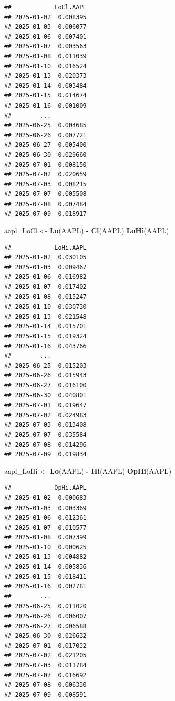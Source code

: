 \documentclass[]{ctexbook}
\newenvironment{Shaded}{\begin{snugshade}}{\end{snugshade}}
\newcommand{\FunctionTok}[1]{\textcolor[rgb]{0.13,0.29,0.53}{\textbf{#1}}}
\newcommand{\NormalTok}[1]{#1}
\newcommand{\OtherTok}[1]{\textcolor[rgb]{0.56,0.35,0.01}{#1}}
\newcommand{\SpecialCharTok}[1]{\textcolor[rgb]{0.81,0.36,0.00}{\textbf{#1}}}
\begin{document}
\begin{verbatim}
##            LoCl.AAPL
## 2025-01-02  0.008395
## 2025-01-03  0.006077
## 2025-01-06  0.007401
## 2025-01-07  0.003563
## 2025-01-08  0.011039
## 2025-01-10  0.016524
## 2025-01-13  0.020373
## 2025-01-14  0.003484
## 2025-01-15  0.014674
## 2025-01-16  0.001009
##        ...          
## 2025-06-25  0.004685
## 2025-06-26  0.007721
## 2025-06-27  0.005400
## 2025-06-30  0.029660
## 2025-07-01  0.008150
## 2025-07-02  0.020659
## 2025-07-03  0.008215
## 2025-07-07  0.005508
## 2025-07-08  0.007484
## 2025-07-09  0.018917
\end{verbatim}

\begin{Shaded}
\begin{Highlighting}[]
\NormalTok{aapl\_LoCl }\OtherTok{\textless{}{-}} \FunctionTok{Lo}\NormalTok{(AAPL) }\SpecialCharTok{{-}} \FunctionTok{Cl}\NormalTok{(AAPL)}
\FunctionTok{LoHi}\NormalTok{(AAPL)}
\end{Highlighting}
\end{Shaded}

\begin{verbatim}
##            LoHi.AAPL
## 2025-01-02  0.030105
## 2025-01-03  0.009467
## 2025-01-06  0.016982
## 2025-01-07  0.017402
## 2025-01-08  0.015247
## 2025-01-10  0.030730
## 2025-01-13  0.021548
## 2025-01-14  0.015701
## 2025-01-15  0.019324
## 2025-01-16  0.043766
##        ...          
## 2025-06-25  0.015203
## 2025-06-26  0.015943
## 2025-06-27  0.016100
## 2025-06-30  0.040801
## 2025-07-01  0.019647
## 2025-07-02  0.024983
## 2025-07-03  0.013408
## 2025-07-07  0.035584
## 2025-07-08  0.014296
## 2025-07-09  0.019834
\end{verbatim}

\begin{Shaded}
\begin{Highlighting}[]
\NormalTok{aapl\_LoHi }\OtherTok{\textless{}{-}} \FunctionTok{Lo}\NormalTok{(AAPL) }\SpecialCharTok{{-}} \FunctionTok{Hi}\NormalTok{(AAPL)}
\FunctionTok{OpHi}\NormalTok{(AAPL)}
\end{Highlighting}
\end{Shaded}

\begin{verbatim}
##            OpHi.AAPL
## 2025-01-02  0.000683
## 2025-01-03  0.003369
## 2025-01-06  0.012361
## 2025-01-07  0.010577
## 2025-01-08  0.007399
## 2025-01-10  0.000625
## 2025-01-13  0.004882
## 2025-01-14  0.005836
## 2025-01-15  0.018411
## 2025-01-16  0.002781
##        ...          
## 2025-06-25  0.011020
## 2025-06-26  0.006007
## 2025-06-27  0.006588
## 2025-06-30  0.026632
## 2025-07-01  0.017032
## 2025-07-02  0.021205
## 2025-07-03  0.011784
## 2025-07-07  0.016692
## 2025-07-08  0.006330
## 2025-07-09  0.008591
\end{verbatim}
\end{document}
